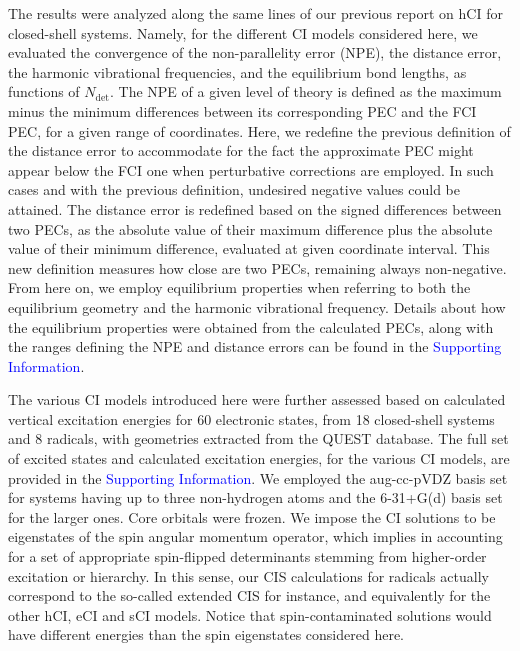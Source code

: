 \documentclass[aip,jcp,reprint,noshowkeys,superscriptaddress]{revtex4-1}
\newcommand{\SupInf}{\textcolor{blue}{Supporting Information}}
\newcommand{\Ndet}{N_\text{det}}
\begin{document}
The results were analyzed along the same lines of our previous report on hCI for closed-shell systems. \cite{Kossoski_2022}
Namely, for the different CI models considered here,
we evaluated the convergence of the non-parallelity error (NPE), the distance error, the harmonic vibrational frequencies, and the equilibrium bond lengths, as functions of $\Ndet$.
The NPE of a given level of theory is defined as the maximum minus the minimum differences between its corresponding PEC and the FCI PEC, for a given range of coordinates.
Here, we redefine the previous definition of the distance error \cite{Kossoski_2022} to accommodate for the fact the approximate PEC might appear below the FCI one when perturbative corrections are employed.
In such cases and with the previous definition, undesired negative values could be attained.
The distance error is redefined based on the signed differences between two PECs, as the absolute value of their maximum difference plus the absolute value of their minimum difference,
evaluated at given coordinate interval.
This new definition measures how close are two PECs, remaining always non-negative.
From here on, we employ equilibrium properties when referring to both the equilibrium geometry and the harmonic vibrational frequency.
Details about how the equilibrium properties were obtained from the calculated PECs,
along with the ranges defining the NPE and distance errors can be found in the \SupInf.

The various CI models introduced here were further assessed based on calculated vertical excitation energies for 60 electronic states,
from 18 closed-shell systems and 8 radicals, with geometries extracted from the QUEST database. \cite{Veril_2021}
The full set of excited states and calculated excitation energies, for the various CI models, are provided in the {\SupInf}.
We employed the aug-cc-pVDZ basis set for systems having up to three non-hydrogen atoms and the 6-31+G(d) basis set for the larger ones.
Core orbitals were frozen.
We impose the CI solutions to be eigenstates of the spin angular momentum operator, which implies in accounting for a set of appropriate spin-flipped determinants stemming from higher-order excitation or hierarchy.
In this sense, our CIS calculations for radicals actually correspond to the so-called extended CIS \cite{Maurice_1996} for instance, and equivalently for the other hCI, eCI and sCI models.
Notice that spin-contaminated solutions would have different energies than the spin eigenstates considered here.
\end{document}
